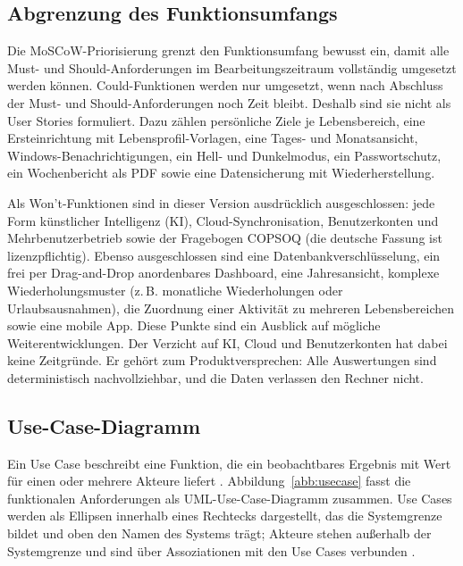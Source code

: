 \endgroup
{}

\subsection{Abgrenzung des Funktionsumfangs}\label{sec:abgrenzung}
Die MoSCoW-Priorisierung grenzt den Funktionsumfang bewusst ein, damit alle Must- und Should-Anforderungen im Bearbeitungszeitraum vollständig umgesetzt werden können. Could-Funktionen werden nur umgesetzt, wenn nach Abschluss der Must- und Should-Anforderungen noch Zeit bleibt. Deshalb sind sie nicht als User Stories formuliert. Dazu zählen persönliche Ziele je Lebensbereich, eine Ersteinrichtung mit Lebensprofil-Vorlagen, eine Tages- und Monatsansicht, Windows-Benachrichtigungen, ein Hell- und Dunkelmodus, ein Passwortschutz, ein Wochenbericht als \ac{PDF} sowie eine Datensicherung mit Wiederherstellung.

Als Won't-Funktionen sind in dieser Version ausdrücklich ausgeschlossen: jede Form künstlicher Intelligenz (\acs{KI}), Cloud-Synchronisation, Benutzerkonten und Mehrbenutzerbetrieb sowie der Fragebogen COPSOQ (die deutsche Fassung ist lizenzpflichtig). Ebenso ausgeschlossen sind eine Datenbankverschlüsselung, ein frei per Drag-and-Drop anordenbares Dashboard, eine Jahresansicht, komplexe Wiederholungsmuster (z.\,B. monatliche Wiederholungen oder Urlaubsausnahmen), die Zuordnung einer Aktivität zu mehreren Lebensbereichen sowie eine mobile App. Diese Punkte sind ein Ausblick auf mögliche Weiterentwicklungen. Der Verzicht auf \ac{KI}, Cloud und Benutzerkonten hat dabei keine Zeitgründe. Er gehört zum Produktversprechen: Alle Auswertungen sind deterministisch nachvollziehbar, und die Daten verlassen den Rechner nicht.

\subsection{Use-Case-Diagramm}\label{sec:usecase}
Ein Use Case beschreibt eine Funktion, die ein beobachtbares Ergebnis mit Wert für einen oder mehrere Akteure liefert \parencite[S.~639]{omg2017uml}. Abbildung~\ref{abb:usecase} fasst die funktionalen Anforderungen als \ac{UML}-Use-Case-Diagramm zusammen. Use Cases werden als Ellipsen innerhalb eines Rechtecks dargestellt, das die Systemgrenze bildet und oben den Namen des Systems trägt; Akteure stehen außerhalb der Systemgrenze und sind über Assoziationen mit den Use Cases verbunden \parencite[S.~641]{omg2017uml}.

